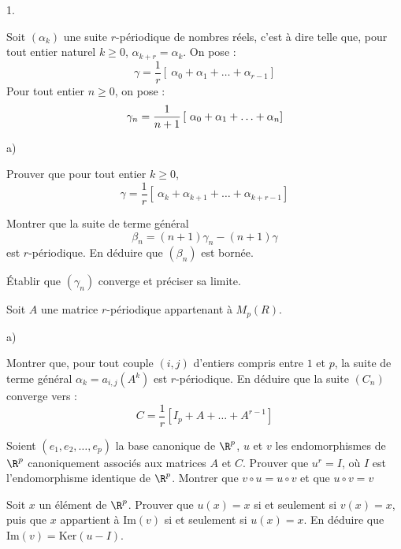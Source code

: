 \documentclass[11pt]{article}%
\begin{document}
\begin{noliste}{1.}
 \setlength{\itemsep}{4mm}
\item Soit $(\alpha_{k})$ une suite $r$-périodique de nombres réels,
c'est à
dire telle que, pour tout entier naturel $k\geq 0$, $\alpha
_{k + r} = \alpha_{k}$. On pose : 
\[
\gamma = \dfrac{1}{r}\left[ \ \alpha_{0} + \alpha_{1} + \ldots +
\alpha_{r-1}\right] 
\]
Pour tout entier $n\geq 0$, on pose : 
\begin{equation}
\gamma_{n} = \dfrac{1}{n + 1}\left[ \ \alpha_{0} + \alpha_{1} + \ldots
+ \alpha_{n}\right] \label{gamma_{n}}
\end{equation}

\begin{noliste}{a)}
 \setlength{\itemsep}{2mm}
\item Prouver que pour tout entier $k\geq 0$, 
\[
\gamma = \dfrac{1}{r}\left[ \ \alpha_{k} + \alpha_{k + 1} + \ldots +
\alpha_{k + r-1}\right] 
\]

\item Montrer que la suite de terme général 
\[
\beta_{n} = (n + 1)\gamma_{n}-(n + 1)\gamma 
\]
est $r$-périodique. En déduire que $(\beta_{n})$ est bornée. 

\item Établir que $(\gamma_{n})$ converge et préciser sa limite. 
\end{noliste}

\item Soit $A$ une matrice $r$-périodique appartenant à $M_{p}(R)$. 

\begin{noliste}{a)}
 \setlength{\itemsep}{2mm}
\item Montrer que, pour tout couple $(i,j)$ d'entiers compris entre $1$
et $p
$, la suite de terme général $\alpha_{k} = a_{i,j}(A^{k})$ est
$r$-périodique. En déduire que la suite $(C_{n})$ converge vers : 
\[
C = \dfrac{1}{r}\left[ I_{p} + A + \ldots + A^{r-1}\right] 
\]

\item Soient $(e_{1},e_{2},\ldots,e_{p})$ la base canonique de
$\R^{p}$, $u$ et $v$ les endomorphismes de $\R^{p}$ canoniquement
associés aux matrices $A$ et $C$. Prouver que $u^{r} = I$, où $I$ est
l'endomorphisme identique de $\R^{p}$. Montrer que $v\circ u = u\circ v
$ et que $u\circ v = v$ 

\item Soit $x$ un élément de $\R^{p}$. Prouver que $u(x) = x$ si et
seulement si $v(x) = x$, puis que $x$ appartient à $\text{Im}(v)$ si et
seulement si $u(x) = x$. En déduire que $\text{Im}(v) =
\text{Ker}(u-I)$. 


\end{noliste}
\end{noliste}
\end{document}

